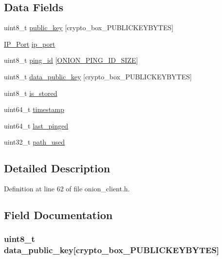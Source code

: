 \subsection*{Data Fields}
\begin{DoxyCompactItemize}
\item 
uint8\+\_\+t \hyperlink{struct_onion___node_aaa806bb1136fb3d4b5d8d8970b596ff7}{public\+\_\+key} \mbox{[}crypto\+\_\+box\+\_\+\+P\+U\+B\+L\+I\+C\+K\+E\+Y\+B\+Y\+T\+E\+S\mbox{]}
\item 
\hyperlink{struct_i_p___port}{I\+P\+\_\+\+Port} \hyperlink{struct_onion___node_a86e2a5a56c0dd22df6e8b8a10e40f9e4}{ip\+\_\+port}
\item 
uint8\+\_\+t \hyperlink{struct_onion___node_aa21328f812472705a8d7bcee491bb54d}{ping\+\_\+id} \mbox{[}\hyperlink{onion__announce_8h_a53426e5a269d092b0b862a3516549716}{O\+N\+I\+O\+N\+\_\+\+P\+I\+N\+G\+\_\+\+I\+D\+\_\+\+S\+I\+Z\+E}\mbox{]}
\item 
uint8\+\_\+t \hyperlink{struct_onion___node_add8f6d39a7818b6d3ff0fca42a0aadf4}{data\+\_\+public\+\_\+key} \mbox{[}crypto\+\_\+box\+\_\+\+P\+U\+B\+L\+I\+C\+K\+E\+Y\+B\+Y\+T\+E\+S\mbox{]}
\item 
uint8\+\_\+t \hyperlink{struct_onion___node_ada3701a9ce02699f1b7e8f55a41379bf}{is\+\_\+stored}
\item 
uint64\+\_\+t \hyperlink{struct_onion___node_a465bef81f6478756e5443025b1f2ddfa}{timestamp}
\item 
uint64\+\_\+t \hyperlink{struct_onion___node_a4049204f6c392628d31be6c39f03e031}{last\+\_\+pinged}
\item 
uint32\+\_\+t \hyperlink{struct_onion___node_a75c3cb4fcbcf13c47379cc14737926d9}{path\+\_\+used}
\end{DoxyCompactItemize}


\subsection{Detailed Description}


Definition at line 62 of file onion\+\_\+client.\+h.



\subsection{Field Documentation}
\hypertarget{struct_onion___node_add8f6d39a7818b6d3ff0fca42a0aadf4}{
\subsubsection[{data\+\_\+public\+\_\+key}]{\setlength{\rightskip}{0pt plus 5cm}uint8\+\_\+t data\+\_\+public\+\_\+key\mbox{[}crypto\+\_\+box\+\_\+\+P\+U\+B\+L\+I\+C\+K\+E\+Y\+B\+Y\+T\+E\+S\mbox{]}}}\label{struct_onion___node_add8f6d39a7818b6d3ff0fca42a0aadf4}


